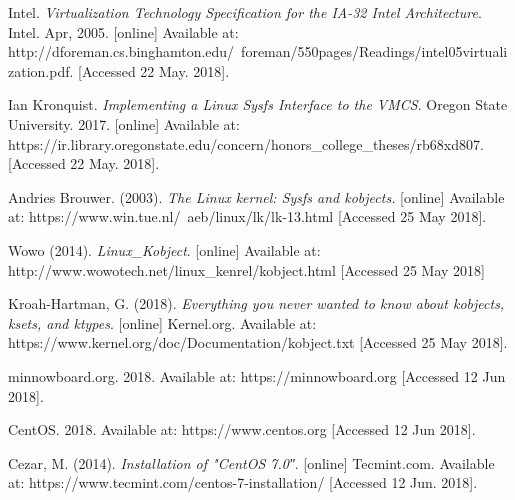 \documentclass[10pt,draftclsnofoot,journal,compsoc,onecolumn]{IEEEtran}
\begin{document}
\newpage
\begin{thebibliography}{6}

Intel. \textit{Virtualization Technology Specification for the IA-32 Intel Architecture}. Intel. Apr, 2005. [online] Available at:  http://dforeman.cs.binghamton.edu/~foreman/550pages/Readings/intel05virtualization.pdf. [Accessed 22 May. 2018].

Ian Kronquist. \textit{Implementing a Linux Sysfs Interface to the VMCS}. Oregon State University. 2017. [online] Available at: https://ir.library.oregonstate.edu/concern/honors\_college\_theses/rb68xd807. [Accessed 22 May. 2018].

Andries Brouwer. (2003). \textit{The Linux kernel: Sysfs and kobjects.} [online] Available at: https://www.win.tue.nl/~aeb/linux/lk/lk-13.html [Accessed 25 May 2018].

Wowo (2014). \textit{Linux\_Kobject}. [online] Available at: http://www.wowotech.net/linux\_kenrel/kobject.html [Accessed 25 May 2018]

Kroah-Hartman, G. (2018). \textit{Everything you never wanted to know about kobjects, ksets, and ktypes}. [online] Kernel.org. Available at: https://www.kernel.org/doc/Documentation/kobject.txt [Accessed 25 May 2018].

minnowboard.org. 2018. Available at: https://minnowboard.org [Accessed 12 Jun 2018].

CentOS. 2018. Available at: https://www.centos.org [Accessed 12 Jun 2018].

Cezar, M. (2014). \textit{Installation of "CentOS 7.0″}. [online] Tecmint.com.
Available at: https://www.tecmint.com/centos-7-installation/ [Accessed 12 Jun. 2018].

\end{thebibliography}
\end{document}
